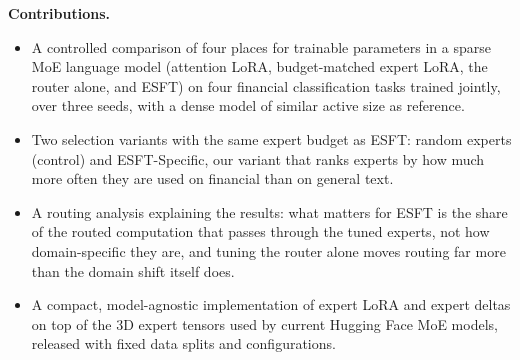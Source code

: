 \textbf{Contributions.}
\begin{itemize}
  \item A controlled comparison of four places for trainable parameters in a sparse MoE
  language model (attention LoRA, budget-matched expert LoRA, the router alone, and ESFT) on
  four financial classification tasks trained jointly, over three seeds, with a dense model of
  similar active size as reference.
  \item Two selection variants with the same expert budget as ESFT: random experts (control)
  and ESFT-Specific, our variant that ranks experts by how much more often they are used on
  financial than on general text.
  \item A routing analysis explaining the results: what matters for ESFT is the share of the
  routed computation that passes through the tuned experts, not how domain-specific they are,
  and tuning the router alone moves routing far more than the domain shift itself does.
  \item A compact, model-agnostic implementation of expert LoRA and expert deltas on top of the
  3D expert tensors used by current Hugging Face MoE models, released with fixed data splits
  and configurations.
\end{itemize}
